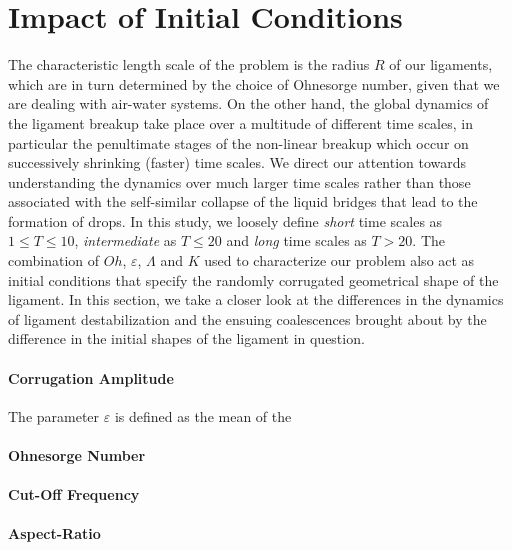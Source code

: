 \section{Impact of Initial Conditions}

The characteristic length scale of the problem is the radius $R$ of our ligaments, 
which are in turn determined by the choice of Ohnesorge number, given that we are dealing with air-water systems.
On the other hand, the global dynamics of the ligament breakup take place over a multitude of different time scales, 
in particular the penultimate stages of the non-linear breakup which occur on successively shrinking (faster) time scales.  
We direct our attention towards understanding the dynamics over much larger time scales rather than those  
associated with the self-similar collapse of the liquid bridges that lead to the formation of drops. 
In this study, we loosely define \textit{short} time scales as $1 \leq T \leq 10$, \textit{intermediate} as 
$T \leq 20 $ and \textit{long} time scales as $T > 20 $. 
The combination of $Oh$, $\varepsilon$, $\Lambda$ and $K$ used to 
characterize our problem also act as initial conditions that specify the 
randomly corrugated geometrical shape of the ligament.  
In this section, we take a closer look at the differences in the dynamics of ligament destabilization 
and the ensuing coalescences brought about by the difference in the initial shapes of the ligament in question.

\paragraph{Corrugation Amplitude}
The parameter $\varepsilon$ is defined as the mean of the  


\paragraph{Ohnesorge Number}

\paragraph{Cut-Off Frequency}

\paragraph{Aspect-Ratio}




